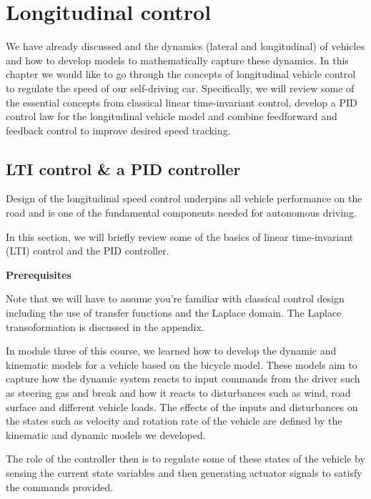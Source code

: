 \section{Longitudinal control}
\label{longitudinal_control}
We have already discussed and the dynamics (lateral and longitudinal) of vehicles and how to develop models to mathematically capture these dynamics. 
In this chapter we would like to go through the concepts of longitudinal vehicle control to regulate the speed of our self-driving car. 
Specifically, we will review some of the essential concepts from classical linear time-invariant control, develop a PID control law for the longitudinal vehicle model and combine feedforward and feedback control to improve desired speed tracking. 

\subsection{LTI control \& a PID controller}
Design of the longitudinal speed control underpins all vehicle performance on the road and is one of the fundamental components needed for autonomous driving. 

In this section, we will briefly review some of the basics of linear time-invariant (LTI) control and the PID controller. 

\begin{framed}
\theoremstyle{remark}
\begin{remark}{\textbf{Prerequisites}}

Note that we will have to assume you're familiar with classical control design including the use of transfer functions and the Laplace domain. 
The Laplace transoformation is discussed in the appendix.
\end{remark}
\end{framed}

In module three of this course, we learned how to develop the dynamic and kinematic models for a vehicle based on the bicycle model. 
These models aim to capture how the dynamic system reacts to input commands from the driver such as steering gas and break and how it reacts to disturbances such as wind, road surface and different vehicle loads. 
The effects of the inputs and disturbances on the states such as velocity and rotation rate of the vehicle 
are defined by the kinematic and dynamic models we developed. 

The role of the controller then is to regulate some of these states of the vehicle by sensing the current state variables and then generating actuator signals to satisfy the commands provided. 


